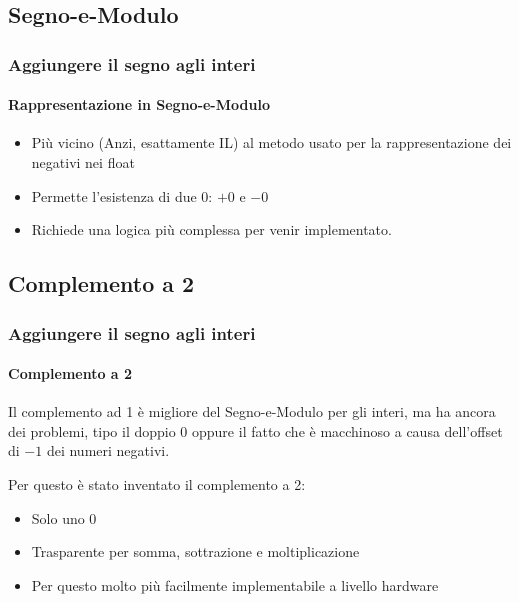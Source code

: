 \documentclass{beamer}
\begin{document}
  \subsection{Segno-e-Modulo}
  \begin{frame}
  		\frametitle{Aggiungere il segno agli interi}
    \framesubtitle{Rappresentazione in Segno-e-Modulo}
    
    \begin{itemize}
    		\item Più vicino (Anzi, esattamente IL) al metodo usato per la rappresentazione dei negativi nei float
    		\item Permette l'esistenza di due 0: $+0$ e $-0$
    		\item Richiede una logica più complessa per venir implementato.
    \end{itemize}
  \end{frame}
  \subsection{Complemento a 2}
  \begin{frame}
  		\frametitle{Aggiungere il segno agli interi}
    \framesubtitle{Complemento a 2}
		Il complemento ad 1 è migliore del Segno-e-Modulo per gli interi, ma ha ancora dei problemi, tipo
		il doppio $0$ oppure il fatto che è macchinoso a causa dell'offset di $-1$ dei numeri negativi.
		
		Per questo è stato inventato il complemento a 2:
		
		\begin{itemize}
			\item Solo uno 0
			\item Trasparente per somma, sottrazione e moltiplicazione
			\item Per questo molto più facilmente implementabile a livello hardware
		\end{itemize}		    
  \end{frame}
\end{document}
